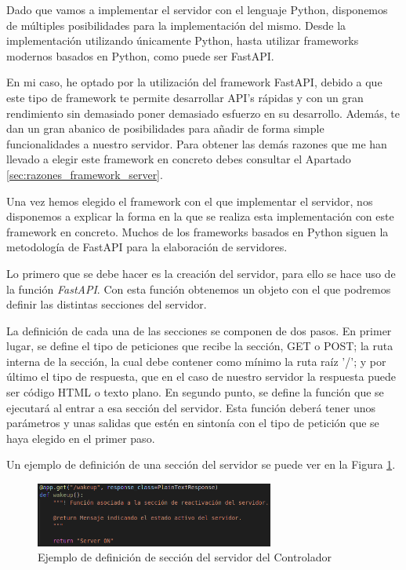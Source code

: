 Dado que vamos a implementar el servidor con el lenguaje Python, disponemos de múltiples posibilidades para la implementación del mismo. Desde la implementación utilizando únicamente Python, hasta utilizar \glspl{framework} modernos basados en Python, como puede ser FastAPI.

En mi caso, he optado por la utilización del \gls{framework} FastAPI, debido a que este tipo de \gls{framework} te permite desarrollar API's rápidas y con un gran rendimiento sin demasiado poner demasiado esfuerzo en su desarrollo. Además, te dan un gran abanico de posibilidades para añadir de forma simple funcionalidades a nuestro servidor. Para obtener las demás razones que me han llevado a elegir este \gls{framework} en concreto debes consultar el Apartado \ref{sec:razones_framework_server}.

Una vez hemos elegido el \gls{framework} con el que implementar el servidor, nos disponemos a explicar la forma en la que se realiza esta implementación con este \gls{framework} en concreto. Muchos de los \glspl{framework} basados en Python siguen la metodología de FastAPI para la elaboración de servidores.

Lo primero que se debe hacer es la creación del servidor, para ello se hace uso de la función \textit{FastAPI}. Con esta función obtenemos un objeto con el que podremos definir las distintas secciones del servidor.

La definición de cada una de las secciones se componen de dos pasos. En primer lugar, se define el tipo de peticiones que recibe la sección, GET o POST; la ruta interna de la sección, la cual debe contener como mínimo la ruta raíz '/'; y por último el tipo de respuesta, que en el caso de nuestro servidor la respuesta puede ser código HTML o texto plano. En segundo punto, se define la función que se ejecutará al entrar a esa sección del servidor. Esta función deberá tener unos parámetros y unas salidas que estén en sintonía con el tipo de petición que se haya elegido en el primer paso.

Un ejemplo de definición de una sección del servidor se puede ver en la Figura \ref{fig:ejem_def_sec_servidor}.

\begin{figure}[h]
\centering
\includegraphics[width=0.7\textwidth]{imagenes/07_Implementacion/ejem_def_sec_servidor.png}
\caption{Ejemplo de definición de sección del servidor del Controlador}
\label{fig:ejem_def_sec_servidor}
\end{figure}

